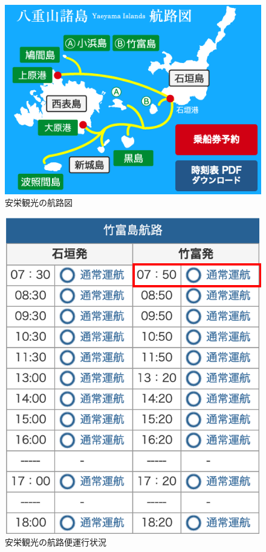 \begin{figure}[H]
 \centering
 \includegraphics[keepaspectratio, scale=0.5]{fig/chapter3/aneikouro.png}
 \caption{安栄観光\cite{anei}の航路図}
 \label{aneikouro}
\end{figure}

\begin{figure}[H]
 \centering
 \includegraphics[keepaspectratio, scale=0.7]{fig/chapter3/anei_sample_data.png}
 \caption{安栄観光\cite{anei}の航路便運行状況}
 \label{anei_label}
\end{figure}


